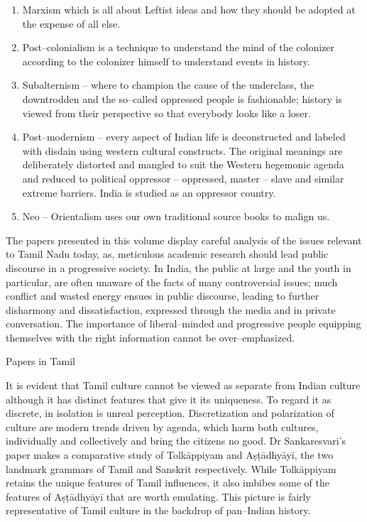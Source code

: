 \begin{enumerate}[{\rm 1)}]
\itemsep=0pt
\item Marxism which is all about Leftist ideas and how they should be adopted at the expense of all else.

 \item Post–colonialism is a technique to understand the mind of the colonizer according to the colonizer himself to understand events in history.

 \item Subalternism – where to champion the cause of the underclass, the downtrodden and the so–called oppressed people is fashionable; history is viewed from their perspective so that everybody looks like a loser. 

 \item Post–modernism – every aspect of Indian life is deconstructed and labeled with disdain using western cultural constructs. The original meanings are deliberately distorted and mangled to suit the Western hegemonic agenda and reduced to political oppressor – oppressed, master – slave and similar extreme barriers. India is studied as an oppressor country.

 \item Neo – Orientalism uses our own traditional source books to malign us.

\end{enumerate}

The papers presented in this volume display careful analysis of the issues relevant to Tamil Nadu today, as, meticulous academic research should lead public discourse in a progressive society. In India, the public at large and the youth in particular, are often unaware of the facts of many controversial issues; much conflict and wasted energy ensues in public discourse, leading to further disharmony and dissatisfaction, expressed through the media and in private conversation. The importance of liberal–minded and progressive people equipping themselves with the right information cannot be over–emphasized.

Papers in Tamil

It is evident that Tamil culture cannot be viewed as separate from Indian culture although it has distinct features that give it its uniqueness. To regard it as discrete, in isolation is unreal perception. Discretization and polarization of culture are modern trends driven by agenda, which harm both cultures, individually and collectively and bring the citizens no good. Dr Sankaresvari’s paper makes a comparative study of Tolkāppiyam and Aṣṭādhyāyī, the two landmark grammars of Tamil and Sanskrit respectively. While Tolkāppiyam retains the unique features of Tamil influences, it also imbibes some of the features of Aṣṭādhyāyī that are worth emulating. This picture is fairly representative of Tamil culture in the backdrop of pan–Indian history.

